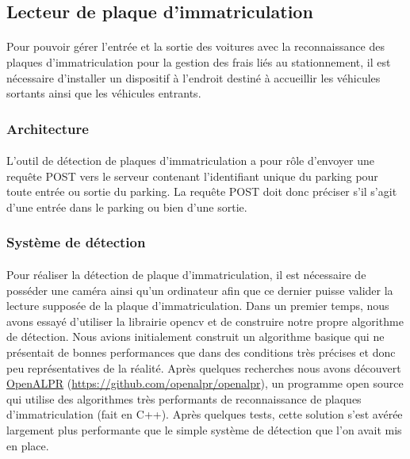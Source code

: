 \subsection{Lecteur de plaque d'immatriculation}


\paragraph*{}
Pour pouvoir gérer l'entrée et la sortie des voitures avec la reconnaissance des plaques d'immatriculation pour la gestion des frais liés au stationnement, il est nécessaire d'installer un dispositif à l'endroit destiné à accueillir les véhicules sortants ainsi que les véhicules entrants.

\subsubsection*{Architecture}
\paragraph*{}

L'outil de détection de plaques d'immatriculation a pour rôle d'envoyer une requête POST vers le serveur contenant l'identifiant unique du parking pour toute entrée ou sortie du parking. La requête POST doit donc préciser s'il s'agit d'une entrée dans le parking ou bien d'une sortie.

\subsubsection*{Système de détection}
\paragraph*{}
Pour réaliser la détection de plaque d'immatriculation, il est nécessaire de posséder une caméra ainsi qu'un ordinateur afin que ce dernier puisse valider la lecture supposée de la plaque d'immatriculation.
Dans un premier temps, nous avons essayé d'utiliser la librairie opencv et de construire notre propre algorithme de détection. Nous avions initialement construit un algorithme basique qui ne présentait de bonnes performances que dans des conditions très précises et donc peu représentatives de la réalité.
Après quelques recherches nous avons découvert \href{https://github.com/openalpr/openalpr}{OpenALPR} (\url{https://github.com/openalpr/openalpr}), un programme open source qui utilise des algorithmes très performants de reconnaissance de plaques d'immatriculation (fait en C++).
Après quelques tests, cette solution s'est avérée largement plus performante que le simple système de détection que l'on avait mis en place.

